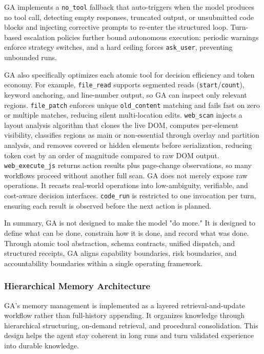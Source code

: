 GA implements a \texttt{no\_tool} fallback that auto-triggers when the model produces no tool call, detecting empty responses, truncated output, or unsubmitted code blocks and injecting corrective prompts to re-enter the structured loop.
Turn-based escalation policies further bound autonomous execution: periodic warnings enforce strategy switches, and a hard ceiling forces \texttt{ask\_user}, preventing unbounded runs.


GA also specifically optimizes each atomic tool for decision efficiency and token economy.  
For example, \texttt{file\_read} supports segmented reads (\texttt{start}/\texttt{count}), keyword anchoring, and line-number output, so GA can inspect only relevant regions.  
\texttt{file\_patch} enforces unique \texttt{old\_content} matching and fails fast on zero or multiple matches, reducing silent multi-location edits.  
\texttt{web\_scan} injects a layout analysis algorithm that clones the live DOM, computes per-element visibility, classifies regions as main or non-essential through overlay and partition analysis, and removes covered or hidden elements before serialization, reducing token cost by an order of magnitude compared to raw DOM output.
\texttt{web\_execute\_js} returns action results plus page-change observations, so many workflows proceed without another full scan.  
GA does not merely expose raw operations.  
It recasts real-world operations into low-ambiguity, verifiable, and cost-aware decision interfaces. 
\texttt{code\_run} is restricted to one invocation per turn, ensuring each result is observed before the next action is planned.

In summary, GA is not designed to make the model "do more."  
It is designed to define what can be done, constrain how it is done, and record what was done.  
Through atomic tool abstraction, schema contracts, unified dispatch, and structured receipts, GA aligns capability boundaries, risk boundaries, and accountability boundaries within a single operating framework.

\subsubsection{Hierarchical Memory Architecture}

GA’s memory management is implemented as a layered retrieval-and-update workflow rather than full-history appending. It organizes knowledge through hierarchical structuring, on-demand retrieval, and procedural consolidation.
This design helps the agent stay coherent in long runs and turn validated experience into durable knowledge.

